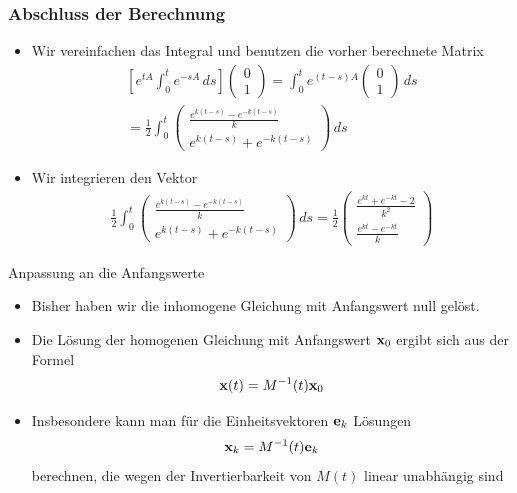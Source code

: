 \begin{frame}
  \frametitle<presentation>{Abschluss der Berechnung}
  \begin{itemize}
  \item Wir vereinfachen das Integral und benutzen die vorher berechnete Matrix
    \begin{multline*}
      \left[e^{tA} \int_0^t e^{-sA}\,ds\right]
      \begin{pmatrix}
        0\\1
      \end{pmatrix}
      = 
      \int_0^t e^{(t-s)A}
      \begin{pmatrix}
        0\\1
      \end{pmatrix}
      \,ds
      \\
      =  \frac12\int_0^t
      \begin{pmatrix}
        \frac{e^{k(t-s)} - e^{-k(t-s)}}k\\
        e^{k(t-s)} + e^{-k(t-s)}
      \end{pmatrix}\,ds
    \end{multline*}
  \item Wir integrieren den Vektor
    \begin{gather*}
      \frac12\int_0^t
      \begin{pmatrix}
        \frac{e^{k(t-s)} - e^{-k(t-s)}}k\\
        e^{k(t-s)} + e^{-k(t-s)}
      \end{pmatrix}\,ds
      =\frac12
      \begin{pmatrix}
        \frac{e^{kt} + e^{-kt}-2}{k^2}\\
        \frac{e^{kt} - e^{-kt}}k
      \end{pmatrix}
    \end{gather*}
  \end{itemize}
\end{frame}

\begin{frame}{Anpassung an die Anfangswerte}
  \begin{itemize}
  \item Bisher haben wir die inhomogene Gleichung mit Anfangswert null gelöst.
  \item Die Lösung der homogenen Gleichung mit Anfangswert $\mathbf{x}_0$ ergibt sich aus der Formel
    \begin{gather*}
      \mathbf{x}(t) = M^{-1}(t) \mathbf{x}_0
    \end{gather*}
  \item Insbesondere kann man für die Einheitsvektoren $\mathbf{e}_k$ Lösungen
    \begin{gather*}
      \mathbf{x}_k = M^{-1}(t) \mathbf{e}_k
    \end{gather*}
    berechnen, die wegen der Invertierbarkeit von $M(t)$ linear unabhängig sind
  \end{itemize}
\end{frame}

